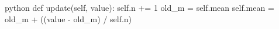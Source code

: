 \begin{mintedbox}{python}
def update(self, value):
    self.n += 1
    old_m = self.mean
    self.mean = old_m + ((value - old_m) / self.n)
\end{mintedbox}